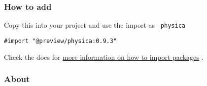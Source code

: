 \subsubsection{How to add}\label{how-to-add}

Copy this into your project and use the import as \texttt{\ physica\ }

\begin{verbatim}
#import "@preview/physica:0.9.3"
\end{verbatim}



Check the docs for
\href{https://typst.app/docs/reference/scripting/\#packages}{more
information on how to import packages} .

\subsubsection{About}\label{about}

